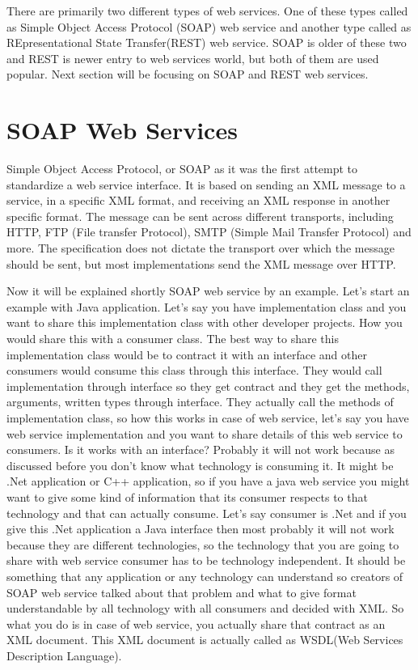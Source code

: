 There are primarily two different types of web services. One of these types called as  Simple Object Access Protocol (SOAP) web service and another type called as REpresentational State Transfer(REST) web service. SOAP is older of these two and REST is newer entry to web services world, but both of them are used popular. Next section will be focusing on SOAP and REST web services.

\section{SOAP Web Services}
\label{section:soa}

Simple Object Access Protocol, or SOAP as it was the first attempt to standardize a web service interface. It is based on sending an XML message to a service, in a specific XML format, and receiving an XML response in another specific format. The message can be sent across different transports, including HTTP, FTP (File transfer Protocol), SMTP (Simple Mail Transfer Protocol) and more\citep{thesis:state2}. The specification does not dictate the transport over which the message should be sent, but most implementations send the XML message over HTTP.

Now it will be explained shortly SOAP web service by an example. Let’s start an example with Java application. Let’s say you have implementation class and you want to share this implementation class with other developer projects. How you would share this with a consumer class. The best way to share this implementation class would be to contract it with an interface and other consumers would consume this class through this interface. They would call implementation through interface so they get contract and they get the methods, arguments, written types through interface. They actually call the methods of implementation class, so how this works in case of web service, let’s say you have web service implementation and you want to share details of this web service to consumers. Is it works with an interface? Probably it will not work because as discussed before you don’t know what technology is consuming it. It might be .Net application or C++ application, so if you have a java web service you might want to give some kind of information that its consumer respects to that technology and that can actually consume. Let’s say consumer is .Net and if you give this .Net application a Java interface then most probably it will not work because they are different technologies, so the technology that you are going to share with web service consumer has to be technology independent. It should be something that any application or any technology can understand so creators of SOAP web service talked about that problem and what to give format understandable by all technology with all consumers and decided with XML. So what you do is in case of web service, you actually share that contract as an XML document. This XML document is actually called as WSDL(Web Services Description Language)\citep{thesis:state3}.

